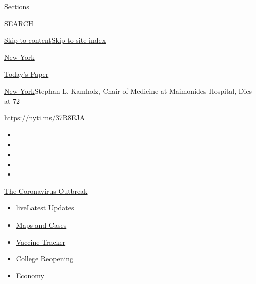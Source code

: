 Sections

SEARCH

\protect\hyperlink{site-content}{Skip to
content}\protect\hyperlink{site-index}{Skip to site index}

\href{https://www.nytimes.com/section/nyregion}{New York}

\href{https://myaccount.nytimes.com/auth/login?response_type=cookie\&client_id=vi}{}

\href{https://www.nytimes.com/section/todayspaper}{Today's Paper}

\href{/section/nyregion}{New York}\textbar{}Stephan L. Kamholz, Chair of
Medicine at Maimonides Hospital, Dies at 72

\url{https://nyti.ms/37R8EJA}

\begin{itemize}
\item
\item
\item
\item
\item
\end{itemize}

\href{https://www.nytimes.com/news-event/coronavirus?action=click\&pgtype=Article\&state=default\&region=TOP_BANNER\&context=storylines_menu}{The
Coronavirus Outbreak}

\begin{itemize}
\tightlist
\item
  live\href{https://www.nytimes.com/2020/08/03/world/coronavirus-covid-19.html?action=click\&pgtype=Article\&state=default\&region=TOP_BANNER\&context=storylines_menu}{Latest
  Updates}
\item
  \href{https://www.nytimes.com/interactive/2020/us/coronavirus-us-cases.html?action=click\&pgtype=Article\&state=default\&region=TOP_BANNER\&context=storylines_menu}{Maps
  and Cases}
\item
  \href{https://www.nytimes.com/interactive/2020/science/coronavirus-vaccine-tracker.html?action=click\&pgtype=Article\&state=default\&region=TOP_BANNER\&context=storylines_menu}{Vaccine
  Tracker}
\item
  \href{https://www.nytimes.com/2020/08/02/us/covid-college-reopening.html?action=click\&pgtype=Article\&state=default\&region=TOP_BANNER\&context=storylines_menu}{College
  Reopening}
\item
  \href{https://www.nytimes.com/live/2020/08/03/business/stock-market-today-coronavirus?action=click\&pgtype=Article\&state=default\&region=TOP_BANNER\&context=storylines_menu}{Economy}
\end{itemize}


